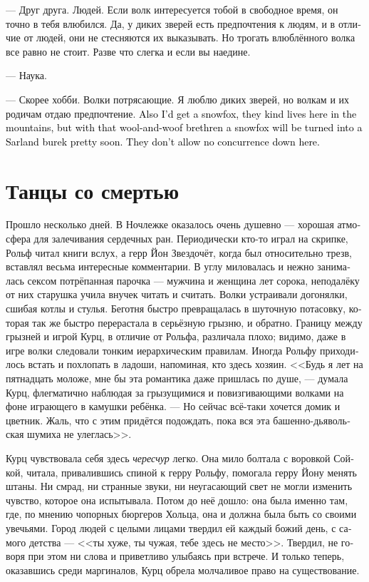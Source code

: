 \documentclass[a4paper,12pt,fleqn]{book}\usepackage{cooltooltips}\usepackage{polyglossia}\setdefaultlanguage[babelshorthands=true]{russian}\setotherlanguage{english}\defaultfontfeatures{Ligatures=TeX,Mapping=tex-text} \usepackage{xcolor}\definecolor{lightgray}{HTML}{bbbbbb}\color{lightgray}\newcommand{\ml}[3]{\textenglish{\textcolor{black}{#3}}}
\begin{document}
--- Друг друга.
Людей.
Если волк интересуется тобой в свободное время, он точно в тебя влюбился.
Да, у диких зверей есть предпочтения к людям, и в отличие от людей, они не стесняются их выказывать.
Но трогать влюблённого волка все равно не стоит.
Разве что слегка и если вы наедине.

--- Наука.

--- Скорее хобби.
Волки потрясающие.
Я люблю диких зверей, но волкам и их родичам отдаю предпочтение.
\ml{$0$}
{Хотел бы ещё завести песца, тут в горах они водятся, но с этой шерстяной братией песец быстро превратится в сарландский бурек.}
{Also I'd get a snowfox, they kind lives here in the mountains, but with that wool-and-woof brethren a snowfox will be turned into a Sarland burek pretty soon.}
\ml{$0$}
{Конкуренции они не терпят.}
{They don't allow no concurrence down here.}

\section{Танцы со смертью}

Прошло несколько дней.
В Ночлежке оказалось очень душевно --- хорошая атмосфера для залечивания сердечных ран.
Периодически кто-то играл на скрипке, Рольф читал книги вслух, а герр Йон Звездочёт, когда был относительно трезв, вставлял весьма интересные комментарии.
В углу миловалась и нежно занималась сексом потрёпанная парочка --- мужчина и женщина лет сорока, неподалёку от них старушка учила внучек читать и считать.
Волки устраивали догонялки, сшибая котлы и стулья.
Беготня быстро превращалась в шуточную потасовку, которая так же быстро перерастала в серьёзную грызню, и обратно.
Границу между грызней и игрой Курц, в отличие от Рольфа, различала плохо;
видимо, даже в игре волки следовали тонким иерархическим правилам.
Иногда Рольфу приходилось встать и похлопать в ладоши, напоминая, кто здесь хозяин.
<<Будь я лет на пятнадцать моложе, мне бы эта романтика даже пришлась по душе, --- думала Курц, флегматично наблюдая за грызущимися и повизгивающими волками на фоне играющего в камушки ребёнка.
--- Но сейчас всё-таки хочется домик и цветник.
Жаль, что с этим придётся подождать, пока вся эта башенно-дьявольская шумиха не улеглась>>.

Курц чувствовала себя здесь \emph{чересчур} легко.
Она мило болтала с воровкой Сойкой, читала, привалившись спиной к герру Рольфу, помогала герру Йону менять штаны.
Ни смрад, ни странные звуки, ни неугасающий свет не могли изменить чувство, которое она испытывала.
Потом до неё дошло: она была именно там, где, по мнению чопорных бюргеров Хольца, она и должна была быть со своими увечьями.
Город людей с целыми лицами твердил ей каждый божий день, с самого детства --- <<ты хуже, ты чужая, тебе здесь не место>>.
Твердил, не говоря при этом ни слова и приветливо улыбаясь при встрече.
И только теперь, оказавшись среди маргиналов, Курц обрела молчаливое право на существование.
\end{document}
